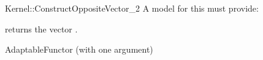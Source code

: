 \begin{ccRefFunctionObjectConcept}{Kernel::ConstructOppositeVector_2}
A model for this must provide:


{returns the vector .}

\ccRefines
AdaptableFunctor (with one argument)

\ccSeeAlso
{} \\

\end{ccRefFunctionObjectConcept}
